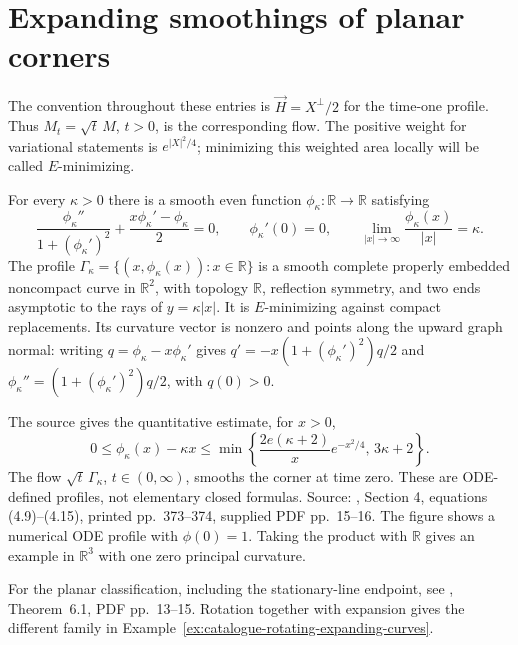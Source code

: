 \chapter{Expanding smoothings of planar corners}\label{sec:catalogue-expanding-corners}
The convention throughout these entries is $\vec H=X^\perp/2$ for the time-one profile. Thus $M_t=\sqrt t\,M$, $t>0$, is the corresponding flow. The positive weight for variational statements is $e^{|X|^2/4}$; minimizing this weighted area locally will be called $E$-minimizing.

\begin{example}\label{ex:catalogue-expanding-corners}
For every $\kappa>0$ there is a smooth even function $\phi_\kappa:\mathbb R\to\mathbb R$ satisfying
\[
 \frac{\phi_\kappa''}{1+(\phi_\kappa')^2}
 +\frac{x\phi_\kappa'-\phi_\kappa}{2}=0,
 \qquad \phi_\kappa'(0)=0,
 \qquad \lim_{|x|\to\infty}\frac{\phi_\kappa(x)}{|x|}=\kappa.
\]
The profile $\Gamma_\kappa=\{(x,\phi_\kappa(x)):x\in\mathbb R\}$ is a smooth complete properly embedded noncompact curve in $\mathbb R^2$, with topology $\mathbb R$, reflection symmetry, and two ends asymptotic to the rays of $y=\kappa|x|$. It is $E$-minimizing against compact replacements. Its curvature vector is nonzero and points along the upward graph normal: writing $q=\phi_\kappa-x\phi_\kappa'$ gives $q'=-x(1+(\phi_\kappa')^2)q/2$ and $\phi_\kappa''=(1+(\phi_\kappa')^2)q/2$, with $q(0)>0$.

The source gives the quantitative estimate, for $x>0$,
\[
 0\leq\phi_\kappa(x)-\kappa x
 \leq\min\left\{\frac{2e(\kappa+2)}{x}e^{-x^2/4},\,3\kappa+2\right\}.
\]
The flow $\sqrt t\,\Gamma_\kappa$, $t\in(0,\infty)$, smooths the corner at time zero. These are ODE-defined profiles, not elementary closed formulas. Source: \cite{CatDing20}, Section 4, equations (4.9)--(4.15), printed pp.~373--374, supplied PDF pp.~15--16. The figure shows a numerical ODE profile with $\phi(0)=1$. Taking the product with $\mathbb R$ gives an example in $\mathbb R^3$ with one zero principal curvature.
\end{example}

For the planar classification, including the stationary-line endpoint, see
\cite{CatHalldorsson2012}, Theorem~6.1, PDF pp.~13--15. Rotation together
with expansion gives the different family in
Example~\ref{ex:catalogue-rotating-expanding-curves}.

